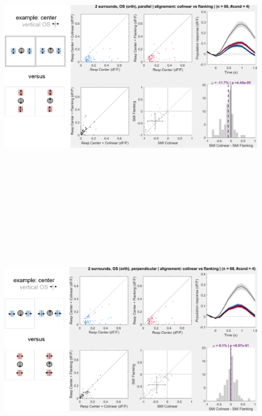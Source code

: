 \begin{figure}[H] \centering \includegraphics[width=11cm,height=11cm,keepaspectratio]{Figures/7.Results/population/sel/diagrams/15.png} 
\end{figure}

\begin{figure}[H] \centering \includegraphics[width=11cm,height=11cm,keepaspectratio]{Figures/7.Results/population/sel/diagrams/16.png} 
\end{figure}

